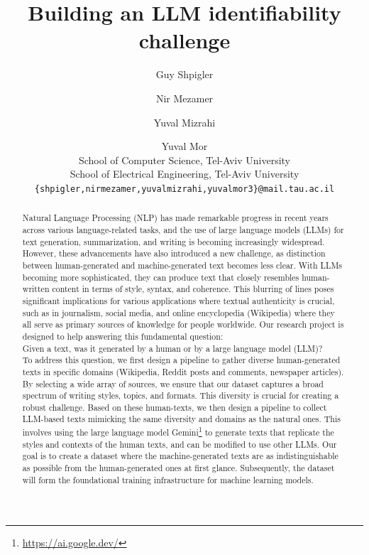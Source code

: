 \documentclass[11pt]{article}
\title{Building an LLM identifiability challenge}
\author{Guy Shpigler \and Nir Mezamer \and Yuval Mizrahi \and Yuval Mor \\
        School of Computer Science, Tel-Aviv University\\
        School of Electrical Engineering, Tel-Aviv University \\
        \texttt{\{shpigler,nirmezamer,yuvalmizrahi,yuvalmor3\}@mail.tau.ac.il}}
\begin{document}
{\makeatletter\acl@finalcopytrue
  \maketitle
}
\begin{abstract}

  Natural Language Processing (NLP) has made remarkable progress in recent years across various language-related tasks, and the use of large language models (LLMs) for text generation, summarization, and writing is becoming increasingly widespread.
  However, these advancements have also introduced a new challenge, as distinction between human-generated and machine-generated text becomes less clear.
  With LLMs becoming more sophisticated, they can produce text that closely resembles human-written content in terms of style, syntax, and coherence.
  This blurring of lines poses significant implications for various applications where textual authenticity is crucial, such as in journalism, social media, and online encyclopedia (Wikipedia) where they all serve as primary sources of knowledge for people worldwide. 
  Our research project is designed to help answering this fundamental question:\\
  Given a text, was it generated by a human or by a large language model (LLM)?\\
  To address this question, we first design a pipeline to gather diverse human-generated texts in specific domains (Wikipedia, Reddit posts and comments, newspaper articles).
  By selecting a wide array of sources, we ensure that our dataset captures a broad spectrum of writing styles, topics, and formats. This diversity is crucial for creating a robust challenge.
  Based on these human-texts, we then design a pipeline to collect LLM-based texts mimicking the same diversity and domains as the natural ones. This involves using the large language model Gemini\footnote{\url{https://ai.google.dev/}} to generate texts that replicate the styles and contexts of the human texts, and can be modified to use other LLMs.
  Our goal is to create a dataset where the machine-generated texts are as indistinguishable as possible from the human-generated ones at first glance. 
  Subsequently, the dataset will form the foundational training infrastructure for machine learning models.
\end{abstract}
\end{document}

